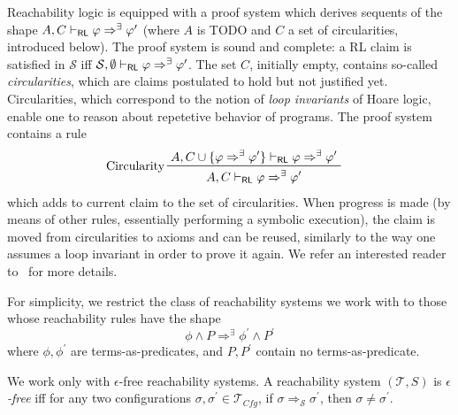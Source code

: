 Reachability logic is equipped with a proof system which derives sequents of the shape
$A, C \vdash_{\mathsf{RL}} \varphi \Rightarrow^\exists \varphi^\prime$ (where $A$ is TODO and $C$ a set of circularities, introduced below). The proof system is sound and complete: a RL claim is satisfied in $\mathcal{S}$
iff $\mathcal{S}, \emptyset \vdash_{\mathsf{RL}} \varphi \Rightarrow^\exists \varphi^\prime$.
The set $C$, initially empty, contains so-called \emph{circularities},
which are claims postulated to hold but not justified yet.
Circularities, which correspond to the notion of \emph{loop invariants} of Hoare logic,
enable one to reason about repetetive behavior of programs.
The proof system contains a rule
\begin{align*}
    & \prftree[l]{Circularity}
      { A, C \cup \{ \varphi\Rightarrow^\exists \varphi^\prime \} \vdash_\RL \varphi \Rightarrow^\exists \varphi^\prime }
      { A, C \vdash_\RL \varphi \Rightarrow^\exists \varphi^\prime }
\end{align*}
which adds to current claim to the set of circularities.
When progress is made (by means of other rules, essentially performing a symbolic execution),
the claim is moved from circularities to axioms and can be reused, similarly to the way one assumes a loop invariant
in order to prove it again.
We refer an interested reader to~\cite{RosuS12oopsla} for more details.




\begin{remark}\label{rem:shapeOfReachabilityRules}
For simplicity, we restrict the class of reachability systems we work with to those whose reachability rules
have the shape
\begin{equation*}
    \phi \land P \Rightarrow^\exists \phi^\prime \land P^\prime
\end{equation*}
where $\phi,\phi^\prime$ are terms-as-predicates, and $P,P^\prime$ contain no terms-as-predicate.
\end{remark}

\begin{remark}\label{rem:noEmptySteps}
We work only with $\epsilon$-free reachability systems.
A reachability system $(\mathcal{T}, S)$ is \emph{$\epsilon$-free}
iff for any two configurations $\sigma, \sigma^\prime \in \mathcal{T}_{\mathit{Cfg}}$, if
$\sigma \Rightarrow_{\mathcal{S}} \sigma^\prime$, then $\sigma \not = \sigma^\prime$.
\end{remark}

